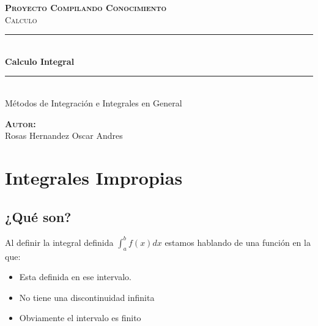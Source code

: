 \documentclass[12pt]{article}							    %
\author{Oscar Andrés Rosas}						            %
\begin{document}
\begin{titlepage}

	\center
	\textbf{\textsc{\Large Proyecto Compilando Conocimiento}}\\[1.0cm] 
	\textsc{\Large Calculo}\\[1.0cm] 

	\rule{\linewidth}{0.5mm} \\[1.0cm]
		{ \huge \bfseries Calculo Integral}\\[1.0cm] 
	\rule{\linewidth}{0.5mm} \\[2.0cm]
	
	{\LARGE Métodos de Integración e Integrales en General}\\[7cm] 
	
	\begin{center} \large
	\textbf{\textsc{Autor:}}\\
	Rosas Hernandez Oscar Andres
	\end{center}

	\vfill

\end{titlepage}






\section{Integrales Impropias}

\subsection{¿Qué son?}

Al definir la integral definida $\int_a^b f(x) dx$ estamos hablando de una función en la que:

\begin{itemize}
    \item Esta definida en ese intervalo.
    \item No tiene una discontinuidad infinita
    \item Obviamente el intervalo es finito
\end{itemize}
\end{document}
